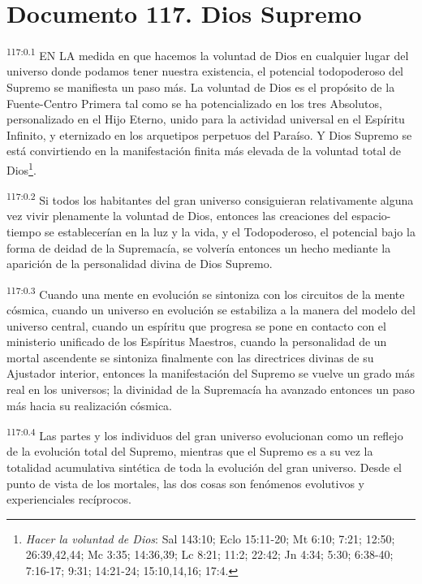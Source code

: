 \chapter{Documento 117. Dios Supremo}
\par
\textsuperscript{117:0.1} EN LA medida en que hacemos la voluntad de Dios en cualquier lugar del universo donde podamos tener nuestra existencia, el potencial todopoderoso del Supremo se manifiesta un paso más. La voluntad de Dios es el propósito de la Fuente-Centro Primera tal como se ha potencializado en los tres Absolutos, personalizado en el Hijo Eterno, unido para la actividad universal en el Espíritu Infinito, y eternizado en los arquetipos perpetuos del Paraíso. Y Dios Supremo se está convirtiendo en la manifestación finita más elevada de la voluntad total de Dios\footnote{\textit{Hacer la voluntad de Dios}: Sal 143:10; Eclo 15:11-20; Mt 6:10; 7:21; 12:50; 26:39,42,44; Mc 3:35; 14:36,39; Lc 8:21; 11:2; 22:42; Jn 4:34; 5:30; 6:38-40; 7:16-17; 9:31; 14:21-24; 15:10,14,16; 17:4.}.

\par
\textsuperscript{117:0.2} Si todos los habitantes del gran universo consiguieran relativamente alguna vez vivir plenamente la voluntad de Dios, entonces las creaciones del espacio-tiempo se establecerían en la luz y la vida, y el Todopoderoso, el potencial bajo la forma de deidad de la Supremacía, se volvería entonces un hecho mediante la aparición de la personalidad divina de Dios Supremo.

\par
\textsuperscript{117:0.3} Cuando una mente en evolución se sintoniza con los circuitos de la mente cósmica, cuando un universo en evolución se estabiliza a la manera del modelo del universo central, cuando un espíritu que progresa se pone en contacto con el ministerio unificado de los Espíritus Maestros, cuando la personalidad de un mortal ascendente se sintoniza finalmente con las directrices divinas de su Ajustador interior, entonces la manifestación del Supremo se vuelve un grado más real en los universos; la divinidad de la Supremacía ha avanzado entonces un paso más hacia su realización cósmica.

\par
\textsuperscript{117:0.4} Las partes y los individuos del gran universo evolucionan como un reflejo de la evolución total del Supremo, mientras que el Supremo es a su vez la totalidad acumulativa sintética de toda la evolución del gran universo. Desde el punto de vista de los mortales, las dos cosas son fenómenos evolutivos y experienciales recíprocos.

